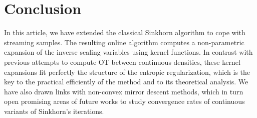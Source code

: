 
\section{Conclusion}

In this article, we have extended the classical Sinkhorn algorithm to cope with streaming samples. The resulting online algorithm computes a non-parametric expansion of the inverse scaling variables using kernel functions. In contrast with previous attempts to compute OT between continuous densities, these kernel expansions fit perfectly the structure of the entropic regularization, which is the key to the practical efficiently of the method and to its theoretical analysis. 
%
We have also drawn links with non-convex mirror descent methods, which in turn open promising areas of future works to study convergence rates of continuous variants of Sinkhorn's iterations.
\vfill